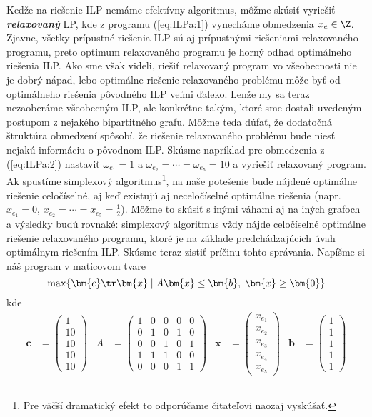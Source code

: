 \noindent Keďže na riešenie ILP nemáme efektívny algoritmus, môžme skúsiť
vyriešiť {\em\bfseries relaxovaný} LP, kde z programu (\ref{eq:ILPa:1})
vynecháme obmedzenia $x_e\in\Z$.  Zjavne, všetky prípustné riešenia ILP sú aj
prípustnými riešeniami relaxovaného programu, preto optimum relaxovaného
programu je horný odhad optimálneho riešenia ILP.  Ako sme však videli, riešiť
relaxovaný program vo všeobecnosti  nie je dobrý nápad, lebo optimálne riešenie
relaxovaného problému môže byť  od optimálneho riešenia pôvodného ILP veľmi
ďaleko.  Lenže my sa teraz nezaoberáme všeobecným ILP, ale konkrétne takým,
ktoré sme dostali uvedeným postupom z nejakého bipartitného grafu.  Môžme teda
dúfať, že dodatočná štruktúra obmedzení spôsobí, že riešenie relaxovaného
problému bude niesť nejakú informáciu o pôvodnom ILP.  
Skúsme napríklad 
pre obmedzenia z (\ref{eq:ILPa:2}) nastaviť $\omega_{e_1}=1$ a
$\omega_{e_2}=\cdots=\omega_{e_5}=10$ a vyriešiť relaxovaný program.
Ak spustíme simplexový algoritmus\footnote{Pre väčší dramatický efekt to odporúčame čitateľovi naozaj
vyskúšať.}, na naše potešenie bude nájdené optimálne riešenie celočíselné, aj
keď existujú aj neceločíselné optimálne riešenia  (napr. $x_{e_1}=0$,
$x_{e_2}=\cdots=x_{e_5}=\frac{1}{2}$).  Môžme to skúsiť s inými váhami aj na
iných grafoch a výsledky budú rovnaké: simplexový algoritmus vždy nájde
celočíselné optimálne riešenie relaxovaného programu, ktoré je na základe
predchádzajúcich úvah optimálnym riešením ILP.
Skúsme teraz zistiť príčinu tohto správania.
Napíšme si náš program v maticovom tvare
$$\max\{\bm{c}\tr\bm{x}\mid A\bm{x}\le\bm{b},\;\bm{x}\ge\bm{0}\}$$
kde
\begin{align*}
\bm{c}&=\left(\begin{array}{c}1\\10\\10\\10\\10\end{array}\right)&
A&=\left(\begin{array}{ccccc}1&0&0&0&0\\0&1&0&1&0\\0&0&1&0&1\\1&1&1&0&0\\0&0&0&1&1\end{array}\right)&
\bm{x}&=\left(\begin{array}{c}x_{e_1}\\x_{e_2}\\x_{e_3}\\x_{e_4}\\x_{e_5}\end{array}\right)&
\bm{b}&=\left(\begin{array}{c}1\\1\\1\\1\\1\end{array}\right)
\end{align*}
